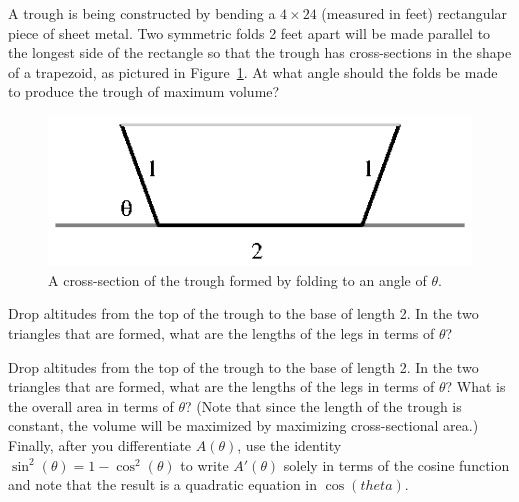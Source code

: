 \begin{activity} \label{A:3.4.4}  
A trough is being constructed by bending a $4 \times 24$ (measured in feet) rectangular piece of sheet metal.  Two symmetric folds 2 feet apart will be made parallel to the longest side of the rectangle so that the trough has cross-sections in the shape of a trapezoid, as pictured in Figure~\ref{F:3.4.Act4}.  At what angle should the folds be made to produce the trough of maximum volume?
\begin{figure}[h]
\begin{center}
\includegraphics{figures/3_4_Act4.eps}
\caption{A cross-section of the trough formed by folding to an angle of $\theta$.} \label{F:3.4.Act4}
\end{center}
\end{figure}
\end{activity}
\begin{smallhint}
Drop altitudes from the top of the trough to the base of length 2.  In the two triangles that are formed, what are the lengths of the legs in terms of $\theta$?
\end{smallhint}
\begin{bighint}
Drop altitudes from the top of the trough to the base of length 2.  In the two triangles that are formed, what are the lengths of the legs in terms of $\theta$?  What is the overall area in terms of $\theta$?  (Note that since the length of the trough is constant, the volume will be maximized by maximizing cross-sectional area.)  Finally, after you differentiate $A(\theta)$, use the identity $\sin^2(\theta) = 1 - \cos^2(\theta)$ to write $A'(\theta)$ solely in terms of the cosine function and note that the result is a quadratic equation in $\cos(theta)$.
\end{bighint}
